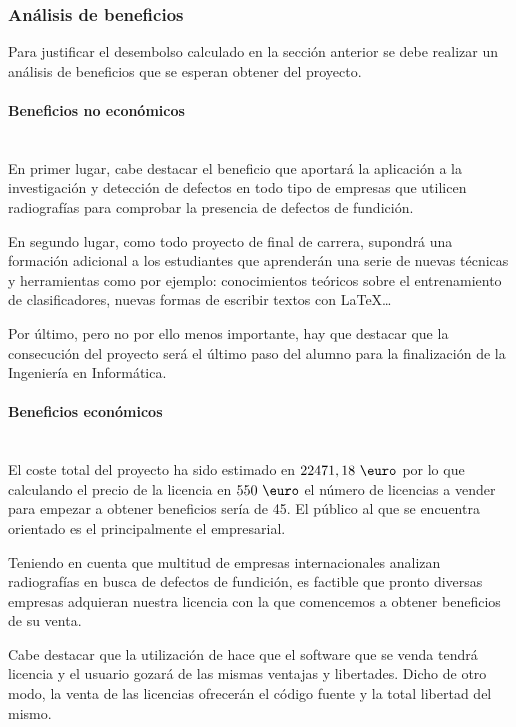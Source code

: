  
\subsubsection{Análisis de beneficios}
Para justificar el desembolso calculado en la sección anterior se debe realizar un análisis de beneficios que se esperan obtener del proyecto.

\paragraph{Beneficios no económicos}\mbox{} \\
\indent En primer lugar, cabe destacar el beneficio que aportará la aplicación a la investigación y detección de defectos en todo tipo de empresas que utilicen radiografías para comprobar la presencia de defectos de fundición.

En segundo lugar, como todo proyecto de final de carrera, supondrá una formación adicional a los estudiantes que aprenderán una serie de nuevas técnicas y herramientas como por ejemplo: conocimientos teóricos sobre el entrenamiento de clasificadores, nuevas formas de escribir textos con \LaTeX{}\dots

Por último, pero no por ello menos importante, hay que destacar que la consecución del proyecto será el último paso del alumno para la finalización de la Ingeniería en Informática.

\paragraph{Beneficios económicos}\mbox{} \\
\indent El coste total del proyecto ha sido estimado en $ 22471,18 \textup{ \euro} $ por lo que calculando el precio de la licencia en $ 550 \textup{ \euro} $ el número de licencias a vender para empezar a obtener beneficios sería de 45. El público al que se encuentra orientado es el principalmente el empresarial.

Teniendo en cuenta que multitud de empresas internacionales analizan radiografías en busca de defectos de fundición, es factible que pronto diversas empresas adquieran nuestra licencia con la que comencemos a obtener beneficios de su venta.

Cabe destacar que la utilización de \weka{} hace que el software que se venda tendrá licencia \gnu{} y el usuario gozará de las mismas ventajas y libertades. Dicho de otro modo, la venta de las licencias ofrecerán el código fuente y la total libertad del mismo.


